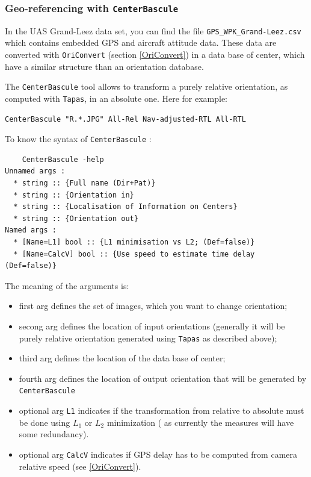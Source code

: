
			
\subsubsection{Geo-referencing with {\tt CenterBascule}}\label{Sec:CenterBascule}


In the UAS Grand-Leez data set, you can find the file {\tt GPS\_WPK\_Grand-Leez.csv} which contains embedded GPS and aircraft attitude data. These data are converted with {\tt OriConvert} (section \ref{OriConvert}) in a data base of center, which have a similar structure than an orientation database.

The {\tt CenterBascule} tool allows to transform a purely relative orientation,
as computed with {\tt Tapas}, in an absolute one. Here for example:

\begin{verbatim}
CenterBascule "R.*.JPG" All-Rel Nav-adjusted-RTL All-RTL
\end{verbatim}

To know the syntax of {\tt CenterBascule} :
\begin{verbatim}
	CenterBascule -help
Unnamed args : 
  * string :: {Full name (Dir+Pat)}
  * string :: {Orientation in}
  * string :: {Localisation of Information on Centers}
  * string :: {Orientation out}
Named args : 
  * [Name=L1] bool :: {L1 minimisation vs L2; (Def=false)}
  * [Name=CalcV] bool :: {Use speed to estimate time delay (Def=false)}
\end{verbatim}

The meaning of the arguments is:

\begin{itemize}
  \item  first arg defines the set of images, which you want to change orientation;
  \item  secong arg defines the location of input orientations (generally it will be purely relative
         orientation generated using {\tt Tapas} as described above);
  \item third arg defines the location of the data base of center;
  \item fourth arg defines the location of output orientation that will be generated by {\tt CenterBascule}
  \item optional arg {\tt L1} indicates if the transformation from relative to absolute
         must be done using $L_1$ or $L_2$ minimization ( as currently the  measures 
         will have some redundancy).
	\item optional arg {\tt CalcV} indicates if GPS delay has to be computed from camera relative speed (see \ref{OriConvert}).
\end{itemize}

